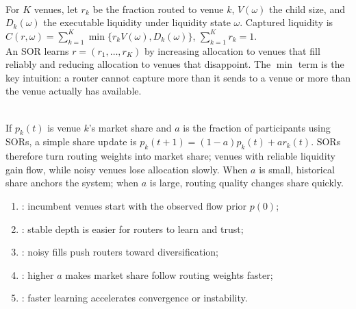 \documentclass[a4paper,oneside,openany]{book}
\begin{document}
\begin{model} \\
For $K$ venues, let $r_k$ be the fraction routed to venue $k$, $V(\omega)$ the child size, and $D_k(\omega)$ the executable liquidity under liquidity state $\omega$. Captured liquidity is $C(r,\omega)=\sum\limits_{k=1}^{K}\min\{r_kV(\omega),D_k(\omega)\}$, $\sum\limits_{k=1}^{K}r_k=1$.\\
An SOR learns $r=(r_1,\ldots,r_K)$ by increasing allocation to venues that fill reliably and reducing allocation to venues that disappoint. The $\min$ term is the key intuition: a router cannot capture more than it sends to a venue or more than the venue actually has available.
\end{model}

\begin{mechanism} \\
If $p_k(t)$ is venue $k$'s market share and $a$ is the fraction of participants using SORs, a simple share update is $p_k(t+1)=(1-a)p_k(t)+a r_k(t)$. SORs therefore turn routing weights into market share; venues with reliable liquidity gain flow, while noisy venues lose allocation slowly. When $a$ is small, historical share anchors the system; when $a$ is large, routing quality changes share quickly.
\end{mechanism}

\begin{taxonomy} 
\begin{enumerate}[label=\roman*.]
\setlength{\itemsep}{0pt}
\item {}: incumbent venues start with the observed flow prior $p(0)$;
\item {}: stable depth is easier for routers to learn and trust;
\item {}: noisy fills push routers toward diversification;
\item {}: higher $a$ makes market share follow routing weights faster;
\item {}: faster learning accelerates convergence or instability.
\end{enumerate}
\end{taxonomy}
\end{document}
